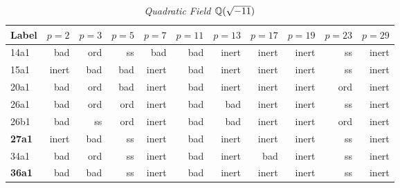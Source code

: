 \documentclass[a4paper,11pt]{article}
\numberwithin{equation}{section}
\begin{document}
\begin{table}[H]	\caption{\label{table:ordinary}\emph{Quadratic Field $\mathbb{Q}(\sqrt{-11})$}}
\begin{tabular}[t]{lrrrrrrrrrr}
	\toprule
Label   &  $p=2$ & $p=3$ & $p=5$ & $p=7$ & $p=11$ & $p=13$ & $p=17$ & $p=19$ & $p=23$ & $p=29$

\\ \midrule 14a1&bad &ord&ss&bad &bad &inert&inert&inert&ss&inert\\ \midrule 15a1&inert&bad &bad &inert&bad &inert&inert&inert&ss&inert\\ \midrule 20a1&bad &ord&bad &inert&bad &inert&inert&inert&ord&inert\\ \midrule 26a1&bad &ord&ord&inert&bad &bad &inert&inert&ss&inert\\ \midrule 26b1&bad &ss&ord&inert&bad &bad &inert&inert&ord&inert\\ \midrule \textbf{27a1}&inert&bad &ss&inert&bad &inert&inert&inert&ss&inert\\ \midrule 34a1&bad &ord&ss&inert&bad &inert&bad &inert&ss&inert\\ \midrule \textbf{36a1}&bad &bad &ss&inert&bad &inert&inert&inert&ss&inert

\\
\bottomrule
\end{tabular}
\end{table}

\footnotesize
\renewcommand{\refname}{\normalsize References}
{}


\Addresses
\end{document}

